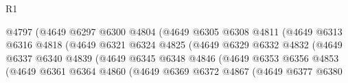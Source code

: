 \begin{lexlean}{R1}
\begin{coremodule}
                                          @4797
                                          (@4649
                                            @6297
                                            @6300
                                            @4804
                                            (@4649
                                              @6305
                                              @6308
                                              @4811
                                              (@4649
                                                @6313
                                                @6316
                                                @4818
                                                (@4649
                                                  @6321
                                                  @6324
                                                  @4825
                                                  (@4649
                                                    @6329
                                                    @6332
                                                    @4832
                                                    (@4649
                                                      @6337
                                                      @6340
                                                      @4839
                                                      (@4649
                                                        @6345
                                                        @6348
                                                        @4846
                                                        (@4649
                                                          @6353
                                                          @6356
                                                          @4853
                                                          (@4649
                                                            @6361
                                                            @6364
                                                            @4860
                                                            (@4649
                                                              @6369
                                                              @6372
                                                              @4867
                                                              (@4649
                                                                @6377
                                                                @6380

\end{coremodule}
\end{lexlean}
